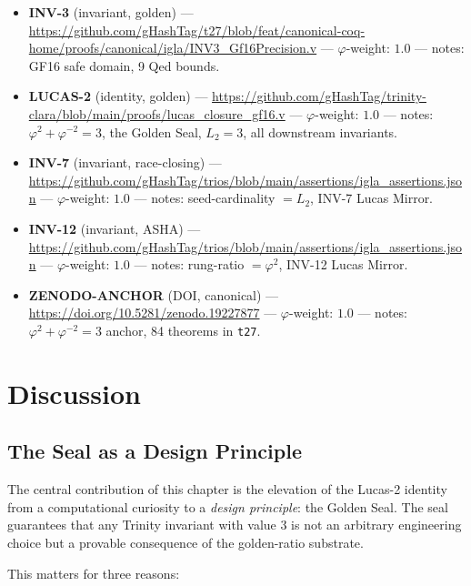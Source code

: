 \begin{itemize}
  \item \textbf{INV-3} (invariant, golden) ---
    \url{https://github.com/gHashTag/t27/blob/feat/canonical-coq-home/proofs/canonical/igla/INV3_Gf16Precision.v}
    --- $\varphi$-weight: $1.0$ --- notes: GF16 safe domain, 9 Qed bounds.
  \item \textbf{LUCAS-2} (identity, golden) ---
    \url{https://github.com/gHashTag/trinity-clara/blob/main/proofs/lucas_closure_gf16.v}
    --- $\varphi$-weight: $1.0$ --- notes: $\varphi^2 + \varphi^{-2} = 3$,
    the Golden Seal, $L_2 = 3$, all downstream invariants.
  \item \textbf{INV-7} (invariant, race-closing) ---
    \url{https://github.com/gHashTag/trios/blob/main/assertions/igla_assertions.json}
    --- $\varphi$-weight: $1.0$ --- notes: seed-cardinality $= L_2$,
    INV-7 Lucas Mirror.
  \item \textbf{INV-12} (invariant, ASHA) ---
    \url{https://github.com/gHashTag/trios/blob/main/assertions/igla_assertions.json}
    --- $\varphi$-weight: $1.0$ --- notes: rung-ratio $= \varphi^2$,
    INV-12 Lucas Mirror.
  \item \textbf{ZENODO-ANCHOR} (DOI, canonical) ---
    \url{https://doi.org/10.5281/zenodo.19227877} ---
    $\varphi$-weight: $1.0$ --- notes: $\varphi^2 + \varphi^{-2} = 3$
    anchor, 84 theorems in \texttt{t27}.
\end{itemize}

\section{Discussion}
\label{sec:gs-discussion}

\subsection{The Seal as a Design Principle}

The central contribution of this chapter is the elevation of
the Lucas-2 identity from a computational curiosity to a
\emph{design principle}: the Golden Seal.  The seal
guarantees that any Trinity invariant with value $3$ is not
an arbitrary engineering choice but a provable consequence of
the golden-ratio substrate.

This matters for three reasons:

